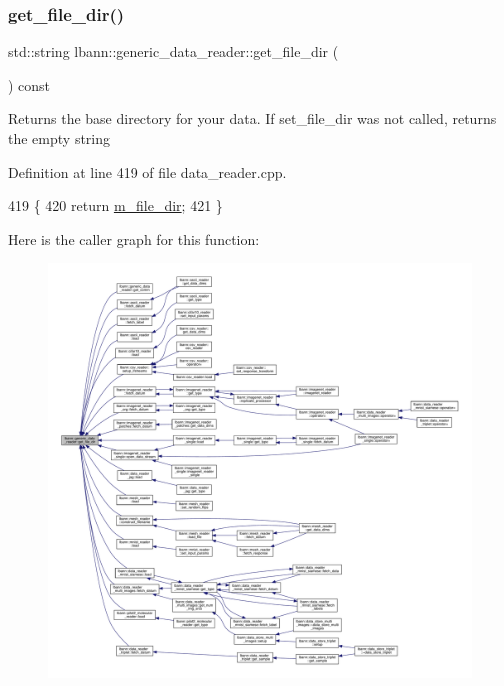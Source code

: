 \subsubsection{\texorpdfstring{get\+\_\+file\+\_\+dir()}{get\_file\_dir()}}
{\footnotesize\ttfamily std\+::string lbann\+::generic\+\_\+data\+\_\+reader\+::get\+\_\+file\+\_\+dir (\begin{DoxyParamCaption}{ }\end{DoxyParamCaption}) const}

Returns the base directory for your data. If set\+\_\+file\+\_\+dir was not called, returns the empty string 

Definition at line 419 of file data\+\_\+reader.\+cpp.


\begin{DoxyCode}
419                                                   \{
420   \textcolor{keywordflow}{return} \hyperlink{classlbann_1_1generic__data__reader_a252002ec211d67606b80bc481a27e820}{m\_file\_dir};
421 \}
\end{DoxyCode}
Here is the caller graph for this function\+:\nopagebreak
\begin{figure}[H]
\begin{center}
\leavevmode
\includegraphics[width=350pt]{classlbann_1_1generic__data__reader_ab4c6c2d4ba40ece809ce896828c8ff03_icgraph}
\end{center}
\end{figure}
\mbox{\label{classlbann_1_1generic__data__reader_a96bb5c116c1a23822f6662b866df4a17}} 
